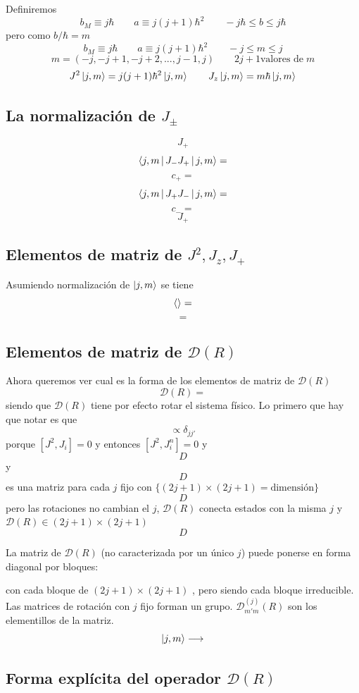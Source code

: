 \documentclass[10pt,oneside]{CBFT_book}
\begin{document}
Definiremos 
\[
	b_M \equiv j \hbar \qquad a \equiv j (j+1) \hbar^2 \qquad -j\hbar \leq b \leq j\hbar
\]
pero como $b/\hbar = m$
\[
	b_M \equiv j \hbar \qquad a \equiv j (j+1) \hbar^2 \qquad -j \leq m \leq j
\]
\[
	m = (-j,-j+1,-j+2,...,j-1,j) \qquad 2j+1 \text{valores de} \; m
\]
\[
	J^2 \Ket{j,m} = j( j+1 )\hbar^2\Ket{j,m} \qquad J_z \Ket{j,m} = m \hbar \Ket{j,m}
\]

\subsection{La normalización de $J_\pm$}

\[
	J_+
\]
\[
	\Braket{j,m|J_-J_+|j,m} = 
\]
\[
	c_+ = 
\]
\[
	\Braket{j,m|J_+J_-|j,m} = 
\]
\[
	c_- =
\]
\[
	J_+
\]

\subsection{Elementos de matriz de $J^2, J_z, J_+$}

Asumiendo normalización de $\Ket{j,m}$ se tiene 
\[
	\Braket{} = 
\]
\[
	=
\]

\subsection{Elementos de matriz de $\mathcal{D}(R)$}

Ahora queremos ver cual es la forma de los elementos de matriz de $\mathcal{D}(R)$
\[
	\mathcal{D}(R) =
\]
siendo que $\mathcal{D}(R)$ tiene por efecto rotar el sistema físico.
Lo primero que hay que notar es que 
\[
	\propto \delta_{jj'}
\]
porque $[J^2,J_i]=0$ y entonces $[J^2,J_i^n]=0$ y 
\[
	D
\]
y 
\[
	D
\]
es una matriz para cada $j$ fijo con $\{ (2j+1)\times(2j+1)=\text{dimensión}\}$
\[
	D
\]
pero las rotaciones no cambian el $j$, $\mathcal{D}(R)$ conecta estados con la misma $j$ y $\mathcal{D}(R) 
\in (2j+1)\times(2j+1)$ 
\[
	D
\]

La matriz de $\mathcal{D}(R)$ (no caracterizada por un único $j$) puede ponerse en forma diagonal por bloques:


con cada bloque de $(2j+1)\times(2j+1)$ , pero siendo cada bloque irreducible. Las matrices de rotación con 
$j$ fijo forman un grupo. $\mathcal{D}_{m'm}^{(j)}(R)$ son los elementillos de la matriz.
\[
	\Ket{j,m} \longrightarrow
\]

\subsection{Forma explícita del operador $\mathcal{D}(R)$}
\end{document}
